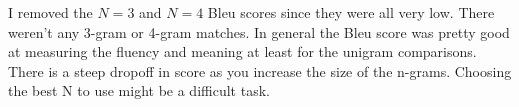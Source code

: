 \documentclass{article}
\begin{document}
I removed the $N=3$ and $N=4$ Bleu scores since they were all very low.  There
weren't any 3-gram or 4-gram matches.  In general the Bleu score was pretty
good at measuring the fluency and meaning at least for the unigram comparisons. 
There is a steep dropoff in score as you increase the size of the n-grams.
Choosing the best N to use might be a difficult task.
\end{document}
